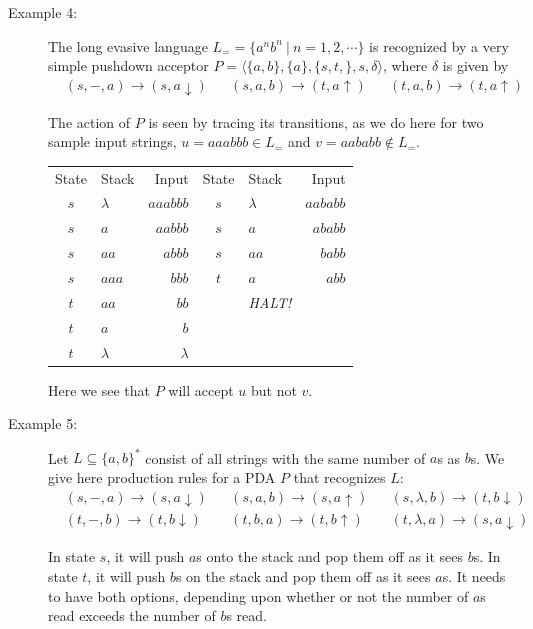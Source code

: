 \documentclass{article}
\begin{document}
\begin{description}

\item[Example 4:] The long evasive language $L_= = \{ a^n b^n\ |\ n=1,2,\cdots \}$ is recognized by a very simple pushdown acceptor $P = \langle \{a,b\}, \{a\}, \{s,t,\}, s, \delta \rangle$, where $\delta$ is given by
  \begin{align*}
  & (s,-,a) \to (s,a \downarrow) & & (s,a,b) \to (t,a \uparrow) & & (t,a,b) \to (t,a \uparrow)
  \end{align*}

  The action of $P$ is seen by tracing its transitions, as we do here for two sample input strings, $u = aaabbb \in L_=$ and $v = aababb \notin L_=$.

  \begin{center}
  \begin{tabular}{clr|clr}
  State & Stack     & Input     &  State & Stack     & Input    \\
   $s$  & $\lambda$ & $aaabbb$  &   $s$  & $\lambda$ & $aababb$ \\
   $s$  & $a$       &  $aabbb$  &   $s$  & $a$       &  $ababb$ \\
   $s$  & $aa$      &   $abbb$  &   $s$  & $aa$      &   $babb$ \\
   $s$  & $aaa$     &    $bbb$  &   $t$  & $a$       &    $abb$ \\
   $t$  & $aa$      &     $bb$  &        & \emph{HALT!} &       \\
   $t$  & $a$       &      $b$  \\
   $t$  & $\lambda$ & $\lambda$ 
  \end{tabular}
  \end{center}

  Here we see that $P$ will accept $u$ but not $v$.

\item[Example 5:] Let $L \subseteq \{a,b\}^*$ consist of all strings with the same number of $a$s as $b$s. We give here production rules for a PDA $P$ that recognizes $L$:
  \begin{align*}
  & (s,-,a) \to (s,a \downarrow) & & (s,a,b) \to (s,a \uparrow) & & (s,\lambda,b) \to (t,b \downarrow) \\
  & (t,-,b) \to (t,b \downarrow) & & (t,b,a) \to (t,b \uparrow) & & (t,\lambda,a) \to (s,a \downarrow)
  \end{align*}

  In state $s$, it will push $a$s onto the stack and pop them off as it sees $b$s. In state $t$, it will push $b$s on the stack and pop them off as it sees $a$s. It needs to have both options, depending upon whether or not the number of $a$s read exceeds the number of $b$s read.

\end{description}
\end{document}

